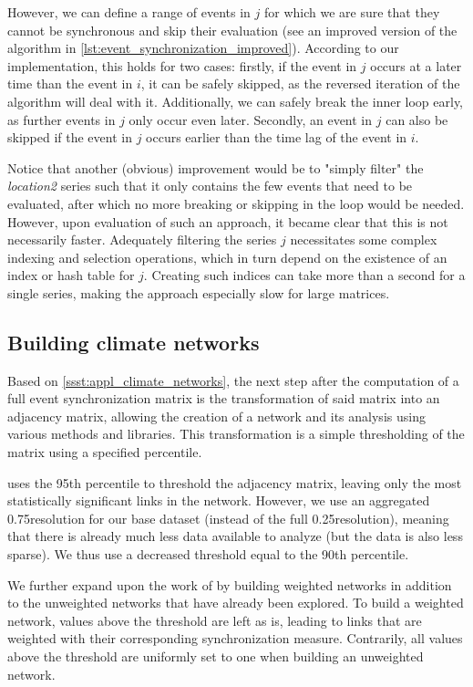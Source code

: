 However, we can define a range of events in $j$ for which we are sure that they cannot be synchronous and skip their evaluation (see an improved version of the algorithm in \cref{lst:event_synchronization_improved}). According to our implementation, this holds for two cases: firstly, if the event in $j$ occurs at a later time than the event in $i$, it can be safely skipped, as the reversed iteration of the algorithm will deal with it. Additionally, we can safely break the inner loop early, as further events in $j$ only occur even later. Secondly, an event in $j$ can  also be skipped if the event in $j$ occurs earlier than the time lag of the event in $i$.

Notice that another (obvious) improvement would be to "simply filter" the \textit{location2} series such that it only contains the few events that need to be evaluated, after which no more breaking or skipping in the loop would be needed. However, upon evaluation of such an approach, it became clear that this is not necessarily faster. Adequately filtering the series $j$ necessitates some complex indexing and selection operations, which in turn depend on the existence of an index or hash table for $j$. Creating such indices can take more than a second for a single series, making the approach especially slow for large matrices.

\subsection{Building climate networks}
\label{sst:building_climate_network}
Based on \cref{ssst:appl_climate_networks}, the next step after the computation of a full event synchronization matrix is the transformation of said matrix into an adjacency matrix, allowing the creation of a network and its analysis using various methods and libraries. This transformation is a simple thresholding of the matrix using a specified percentile.

\citet{Stolbova.2015} uses the 95th percentile to threshold the adjacency matrix, leaving only the most statistically significant links in the network. However, we use an aggregated 0.75\degree resolution for our base dataset (instead of the full 0.25\degree resolution), meaning that there is already much less data available to analyze (but the data is also less sparse). We thus use a decreased threshold equal to the 90th percentile.

We further expand upon the work of \citet{Stolbova.2015} by building weighted networks in addition to the unweighted networks that have already been explored. To build a weighted network, values above the threshold are left as is, leading to links that are weighted with their corresponding synchronization measure. Contrarily, all values above the threshold are uniformly set to one when building an unweighted network.


